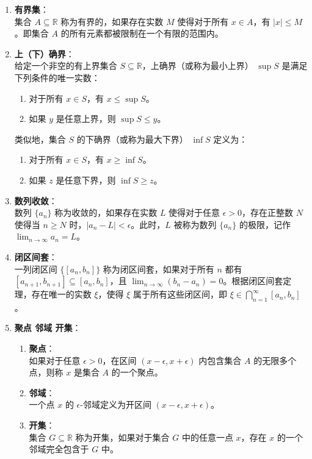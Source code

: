 \documentclass[lang=cn,newtx,10pt,scheme=chinese]{elegantbook}
\begin{document}
\begin{note}
\begin{enumerate}
    \item \textbf{有界集}：\\
    集合 \( A \subseteq \mathbb{R} \) 称为有界的，如果存在实数 \( M \) 使得对于所有 \( x \in A \)，有 \( |x| \leq M \)。即集合 \( A \) 的所有元素都被限制在一个有限的范围内。

    \item \textbf{上（下）确界}：\\
    给定一个非空的有上界集合 \( S \subseteq \mathbb{R} \)，上确界（或称为最小上界） \( \sup S \) 是满足下列条件的唯一实数：
    \begin{enumerate}
        \item 对于所有 \( x \in S \)，有 \( x \leq \sup S \)。
        \item 如果 \( y \) 是任意上界，则 \( \sup S \leq y \)。
    \end{enumerate}
    类似地，集合 \( S \) 的下确界（或称为最大下界） \( \inf S \) 定义为：
    \begin{enumerate}
        \item 对于所有 \( x \in S \)，有 \( x \geq \inf S \)。
        \item 如果 \( z \) 是任意下界，则 \( \inf S \geq z \)。
    \end{enumerate}

    \item \textbf{数列收敛}：\\
    数列 \( \{a_n\} \) 称为收敛的，如果存在实数 \( L \) 使得对于任意 \( \epsilon > 0 \)，存在正整数 \( N \) 使得当 \( n \geq N \) 时，\( |a_n - L| < \epsilon \)。此时，\( L \) 被称为数列 \( \{a_n\} \) 的极限，记作 \( \lim_{n \to \infty} a_n = L \)。

    \item \textbf{闭区间套}：\\
    一列闭区间 \( \{[a_n, b_n]\} \) 称为闭区间套，如果对于所有 \( n \) 都有 \( [a_{n+1}, b_{n+1}] \subseteq [a_n, b_n] \)，且 \( \lim_{n \to \infty} (b_n - a_n) = 0 \)。根据闭区间套定理，存在唯一的实数 \( \xi \)，使得 \( \xi \) 属于所有这些闭区间，即 \( \xi \in \bigcap_{n=1}^{\infty} [a_n, b_n] \)。

    \item \textbf{聚点  邻域  开集}：
    \begin{enumerate}
        \item \textbf{聚点}：\\
        如果对于任意 \( \epsilon > 0 \)，在区间 \( (x - \epsilon, x + \epsilon) \) 内包含集合 \( A \) 的无限多个点，则称 \( x \) 是集合 \( A \) 的一个聚点。
        \item \textbf{邻域}：\\
        一个点 \( x \) 的 \( \epsilon \)-邻域定义为开区间 \( (x - \epsilon, x + \epsilon) \)。
        \item \textbf{开集}：\\
        集合 \( G \subseteq \mathbb{R} \) 称为开集，如果对于集合 \( G \) 中的任意一点 \( x \)，存在 \( x \) 的一个邻域完全包含于 \( G \) 中。
    \end{enumerate}


\end{enumerate}
\end{note}
\end{document}
